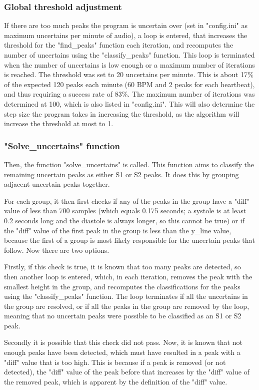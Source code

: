 \subsubsection{Global threshold adjustment}
If there are too much peaks the program is uncertain over (set in "config.ini" as maximum uncertains per minute of audio),  a loop is entered, that increases the threshold for the "find\_peaks" function each iteration, and recomputes the number of uncertains using the "classify\_peaks" function. This loop is terminated when the number of uncertains is low enough or a maximum number of iterations is reached. The threshold was set to 20 uncertains per minute. This is about 17\% of the expected 120 peaks each minute (60 BPM and 2 peaks for each heartbeat), and thus requiring a success rate of 83\%. The maximum number of iterations was determined at 100, which is also listed in "config.ini". This will also determine the step size the program takes in increasing the threshold, as the algorithm will increase the threshold at most to 1.

\subsubsection{"Solve\_uncertains" function}
Then, the function "solve\_uncertains" is called. This function aims to classify the remaining uncertain peaks as either S1 or S2 peaks. It does this by grouping adjacent uncertain peaks together. 

For each group, it then first checks if any of the peaks in the group have a "diff" value of less than 700 samples (which equals 0.175 seconds; a systole is at least 0.2 seconds long \cite{systole_length} and the diastole is always longer, so this cannot be true) or if the "diff" value of the first peak in the group is less than the y\_line value, because the first of a group is most likely responsible for the uncertain peaks that follow. Now there are two options.

Firstly, if this check is true, it is known that too many peaks are detected, so then another loop is entered, which, in each iteration, removes the peak with the smallest height in the group, and recomputes the classifications for the peaks using the "classify\_peaks" function. The loop terminates if all the uncertains in the group are resolved, or if all the peaks in the group are removed by the loop, meaning that no uncertain peaks were possible to be classified as an S1 or S2 peak. 

Secondly it is possible that this check did not pass. Now, it is known that not enough peaks have been detected, which must have resulted in a peak with a "diff" value that is too high. This is because if a peak is removed (or not detected), the "diff" value of the peak before that increases by the "diff" value of the removed peak, which is apparent by the definition of the "diff" value. 

